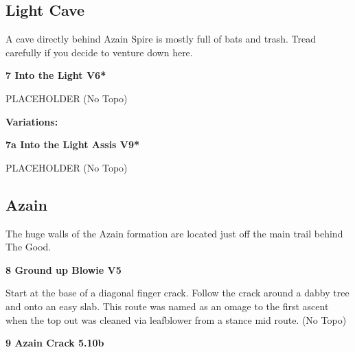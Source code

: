 \begin{multicols}{2}
		\subsection*{Light Cave}\label{bf:Light Cave}
		A cave directly behind Azain Spire is mostly full of bats and trash. Tread carefully if you decide to venture down here.\\
	
			\label{rt:Into the Light}
\colorbox{RoyalBlue!20}{
\parbox{0.95\linewidth}{
\textbf{
7 Into the Light V6*  
}
}
}

			\begin{adjustwidth}{0.5cm}{}				
			PLACEHOLDER
				\newline (No Topo) 
			\end{adjustwidth}
				\begin{adjustwidth}{0.5cm}{}				
				\textbf{Variations:} \newline
					\label{vr:Into the Light Assis}
\colorbox{Goldenrod!50}{
\parbox{0.95\linewidth}{
\textbf{
7a Into the Light Assis V9*  
}
}
}

					\begin{adjustwidth}{0.5cm}{}				
					PLACEHOLDER
						\newline (No Topo) 
					\end{adjustwidth}
				\end{adjustwidth}
		\subsection*{Azain}\label{bf:Azain}
		The huge walls of the Azain formation are located just off the main trail behind The Good.\\
	
			\label{rt:Ground up Blowie}
\colorbox{RoyalBlue!20}{
\parbox{0.95\linewidth}{
\textbf{
8 Ground up Blowie V5  
}
}
}

			\begin{adjustwidth}{0.5cm}{}				
			Start at the base of a diagonal finger crack. Follow the crack around a dabby tree and onto an easy slab. This route was named as an omage to the first ascent when the top out was cleaned via leafblower from a stance mid route.
				\newline (No Topo) 
			\end{adjustwidth}
			\label{rt:Azain Crack}
\colorbox{RoyalBlue!20}{
\parbox{0.95\linewidth}{
\textbf{
9 Azain Crack 5.10b  
}
}
}


\end{multicols}
